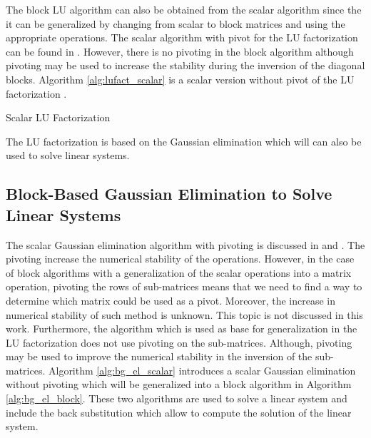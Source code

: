 
The block LU algorithm can also be obtained from the scalar algorithm since the it can be generalized by changing from scalar to block matrices and using the appropriate operations.
The scalar algorithm with pivot for the LU factorization can be found in \cite{BissV1988} \cite{Velde1990}.
However, there is no pivoting in the block algorithm although pivoting may be used to increase the stability during the inversion of the diagonal blocks.
Algorithm \ref{alg:lufact_scalar} is a scalar version without pivot of the LU factorization \cite{GoluL1983}.

\begin{algorithm}[h]
	\DontPrintSemicolon
	\caption{Scalar LU Factorization\label{alg:lufact_scalar}}
\end{algorithm}

The LU factorization is based on the Gaussian elimination which will can also be used to solve linear systems.

\subsection{Block-Based Gaussian Elimination to Solve Linear Systems}

The scalar Gaussian elimination algorithm with pivoting is discussed in \cite{Saad1986} and \cite{GeorC1987}.
The pivoting increase the numerical stability of the operations.
However, in the case of block algorithms with a generalization of the scalar operations into a matrix operation, pivoting the rows of sub-matrices means that we need to find a way to determine which matrix could be used as a pivot.
Moreover, the increase in numerical stability of such method is unknown.
This topic is not discussed in this work.
Furthermore, the algorithm which is used as base for generalization in the LU factorization does not use pivoting on the sub-matrices.
Although, pivoting may be used to improve the numerical stability in the inversion of the sub-matrices.
Algorithm \ref{alg:bg_el_scalar} introduces a scalar Gaussian elimination without pivoting \cite{GoluL1983} which will be generalized into a block algorithm in Algorithm \ref{alg:bg_el_block}.
These two algorithms are used to solve a linear system and include the back substitution which allow to compute the solution of the linear system.



